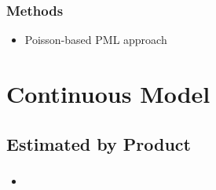 \documentclass{beamer}
\begin{document}
\begin{frame}
\frametitle{Methods}
\begin{itemize}
\item Poisson-based PML approach
\end{itemize}
\end{frame}

\section{Continuous Model}
\subsection{Estimated by Product}
\begin{frame}
\frametitle{}
\begin{itemize}
\item 
\end{itemize}
\end{frame}
\end{document}
